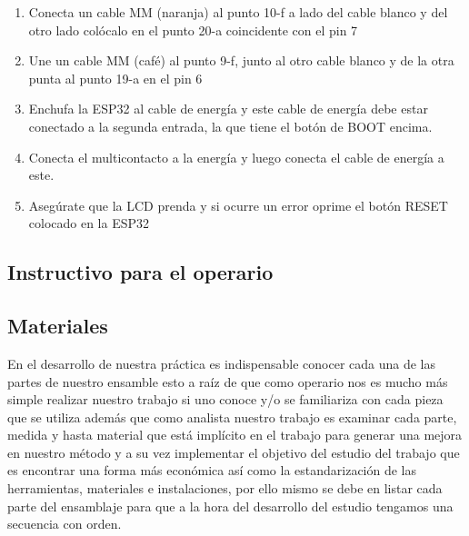 \begin{enumerate}
    \item  Conecta un cable MM (naranja) al punto 10-f a lado del cable blanco y del otro lado colócalo en el punto 20-a coincidente con el pin 7

    \item Une un cable MM (café) al punto 9-f, junto al otro cable blanco y de la otra punta al punto 19-a en el pin 6 

    \item  Enchufa la ESP32 al cable de energía y este cable de energía debe estar conectado a la segunda entrada, la que tiene el botón de BOOT encima.

    \item Conecta el multicontacto a la energía y luego conecta el cable de energía a este.


    \item Asegúrate que la LCD prenda y si ocurre un error oprime el botón RESET colocado en la ESP32

\end{enumerate}






\subsection{Instructivo para el operario}
\setlength{\droptitle}{-5\baselineskip}

\label{Figura:instructivo}






\subsection{Materiales}

En el desarrollo de nuestra práctica es indispensable conocer cada una de las partes de nuestro ensamble esto a raíz de que como operario nos es mucho más simple realizar nuestro trabajo si uno conoce y/o se familiariza con cada pieza que se utiliza además que como analista nuestro trabajo es examinar cada parte, medida y hasta material que está implícito en el trabajo para generar una mejora en nuestro método y a su vez implementar el objetivo del estudio del trabajo que es encontrar una forma más económica así como la estandarización de las herramientas, materiales e instalaciones, por ello mismo se debe en listar cada parte del ensamblaje para que a la hora del desarrollo del estudio tengamos una secuencia con orden.

